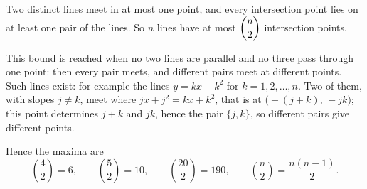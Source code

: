 Two distinct lines meet in at most one point, and every intersection point lies on at least one pair of the lines. So $n$ lines have at most $\dbinom n2$ intersection points.

This bound is reached when no two lines are parallel and no three pass through one point: then every pair meets, and different pairs meet at different points. Such lines exist: for example the lines $y=kx+k^2$ for $k=1,2,\ldots,n$. Two of them, with slopes $j\ne k$, meet where $jx+j^2=kx+k^2$, that is at $\bigl(-(j+k),\,-jk\bigr)$; this point determines $j+k$ and $jk$, hence the pair $\{j,k\}$, so different pairs give different points.

Hence the maxima are
\[\binom42=\boxed6,\qquad\binom52=\boxed{10},\qquad\binom{20}{2}=\boxed{190},\qquad\binom n2=\boxed{\dfrac{n(n-1)}{2}}.\]
